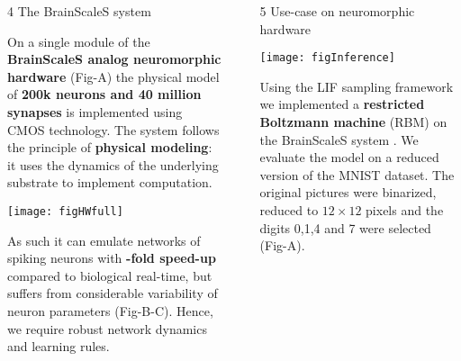 \begin{frame}
\begin{columns}
\begin{column}{0.99\textwidth}
\begin{columns}[t]
\begin{column}{0.32\textwidth}
\begin{block}{\large 4 The BrainScaleS system}
					\justifying
					\begin{adjustwidth}{1.cm}{1.cm}
					 On a single module of the \textbf{BrainScaleS \cite{schemmel2010wafer} analog neuromorphic hardware} (Fig-A) the physical model of \textbf{200k neurons and 40 million synapses} is implemented using CMOS technology.
					 The system follows the principle of \textbf{physical modeling}: it uses the dynamics of the underlying substrate to implement computation.
					 
					\end{adjustwidth}

					\vspace{1.cm}
					\begin{center}
						\texttt{[image: figHWfull]}
					\end{center}

					\begin{adjustwidth}{1cm}{1cm}
					As such it can emulate networks of spiking neurons with \textbf{-fold speed-up} compared to biological real-time, but suffers from considerable variability of neuron parameters (Fig-B-C).
					Hence, we require robust network dynamics and learning rules.

					\end{adjustwidth}

					\blockSpaceOne
					\end{block}




				\end{column}

				\begin{column}{.01\textwidth}\end{column}

				\begin{column}{0.32\textwidth}

					\begin{block}{\large 5 Use-case on neuromorphic hardware}
					\blockSpaceTwo

					\begin{center}
						\texttt{[image: figInference]}
					\end{center}

					\begin{adjustwidth}{1.cm}{1.cm}
					\justify
					 Using the LIF sampling framework we implemented a \textbf{restricted Boltzmann machine} (RBM) \cite{hinton1984boltzmann} on the BrainScaleS system \cite{kungl2019accelerated}.
					 We evaluate the model on a reduced version of the MNIST dataset.
					 The original pictures were binarized, reduced to $12\times12$ pixels and the digits 0,1,4 and 7 were selected (Fig-A).
					\end{adjustwidth}


\end{block}
\end{column}
\end{columns}
\end{column}
\end{columns}
\end{frame}
